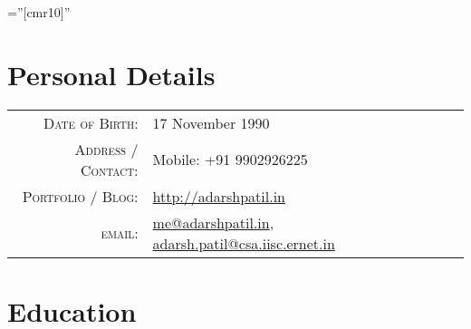 \documentclass[a4paper,10pt]{article} %
\begin{document}
\pagestyle{empty} %

\font\fb=''[cmr10]'' %


\par{\bigskip\par} %

\section{Personal Details}

\begin{tabular}{rl}
\textsc{Date of Birth:} & 17 November 1990 \\
\textsc{Address / Contact:} & Mobile: +91 9902926225 \\
\textsc{Portfolio / Blog:} & \href{http://adarshpatil.in/timewarp}{http://adarshpatil.in}\\
\textsc{email:} & \href{mailto:me@adarshpatil.in}{me@adarshpatil.in}, \href{mailto:adarsh.patil@csa.iisc.ernet.in}{adarsh.patil@csa.iisc.ernet.in}
\end{tabular}


\section{Education}
\end{document}
